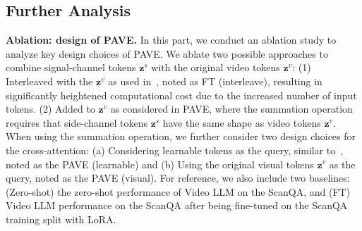 \subsection{Further Analysis} \label{section_res_ablation}
\noindent\textbf{Ablation: design of PAVE.}
In this part, we conduct an ablation study to analyze key design choices of PAVE. 
We ablate two possible approaches to combine signal-channel tokens $\mathbf{z}^s$ with the original video tokens $\mathbf{z}^v$: (1) Interleaved with the $\mathbf{z}^v$ as used in~\cite{li2024llavainterleave}, noted as FT (interleave), resulting in significantly heightened computational cost due to the increased number of input tokens. 
(2) Added to $\mathbf{z}^v$ as considered in PAVE, where the summation operation requires that side-channel tokens $\mathbf{z}^s$ have the same shape as video tokens $\mathbf{z}^v$. 
%
When using the summation operation, we further consider two design choices for the cross-attention: (a) Considering learnable tokens as the query, similar to~\cite{jaegle2022perceiveriogeneralarchitecture}, noted as the PAVE (learnable) and 
(b) Using the original visual tokens $\mathbf{z}^v$ as the query, noted as the PAVE (visual). 
For reference, we also include two baselines: (Zero-shot) the zero-shot performance of Video LLM on the ScanQA, and (FT) Video LLM performance on the ScanQA after being fine-tuned on the ScanQA training split with LoRA.



